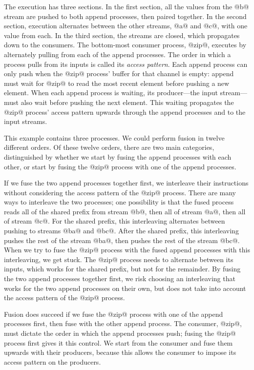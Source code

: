 The execution has three sections.
In the first section, all the values from the @b@ stream are pushed to both append processes, then paired together.
In the second section, execution alternates between the other streams, @a@ and @c@, with one value from each.
In the third section, the streams are closed, which propagates down to the consumers.
The bottom-most consumer process, @zip@, executes by alternately pulling from each of the append processes.
The order in which a process pulls from its inputs is called its \emph{access pattern}.
Each append process can only push when the @zip@ process' buffer for that channel is empty: append must wait for @zip@ to read the most recent element before pushing a new element.
When each append process is waiting, its producer---the input stream---must also wait before pushing the next element.
This waiting propagates the @zip@ process' access pattern upwards through the append processes and to the input streams.

This example contains three processes.
We could perform fusion in twelve different orders.
Of these twelve orders, there are two main categories, distinguished by whether we start by fusing the append processes with each other, or start by fusing the @zip@ process with one of the append processes.

If we fuse the two append processes together first, we interleave their instructions without considering the access pattern of the @zip@ process.
There are many ways to interleave the two processes; one possibility is that the fused process reads all of the shared prefix from stream @b@, then all of stream @a@, then all of stream @c@.
For the shared prefix, this interleaving alternates between pushing to streams @ba@ and @bc@.
After the shared prefix, this interleaving pushes the rest of the stream @ba@, then pushes the rest of the stream @bc@.
When we try to fuse the @zip@ process with the fused append processes with this interleaving, we get stuck.
The @zip@ process needs to alternate between its inputs, which works for the shared prefix, but not for the remainder.
By fusing the two append processes together first, we risk choosing an interleaving that works for the two append processes on their own, but does not take into account the access pattern of the @zip@ process.

Fusion does succeed if we fuse the @zip@ process with one of the append processes first, then fuse with the other append process.
The consumer, @zip@, must dictate the order in which the append processes push; fusing the @zip@ process first gives it this control.
We start from the consumer and fuse them upwards with their producers, because this allows the consumer to impose its access pattern on the producers.

